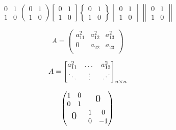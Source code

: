 \documentclass{ctexart}
\newcommand{\adots}{\mathinner{
\mkern2mu\raisebox{0.1em}{.}
\mkern2mu\raisebox{0.4em}{.}
\mkern2mu\raisebox{0.7em}{.}\mkern1mu}}
\begin{document}
    \[  
        \begin{matrix}
            0 & 1   \\
            1 & 0
        \end{matrix}
        \begin{pmatrix}
            0 & 1   \\
            1 & 0
        \end{pmatrix}
        \begin{bmatrix}
            0 & 1   \\
            1 & 0
        \end{bmatrix}
        \begin{Bmatrix}
            0 & 1   \\
            1 & 0
        \end{Bmatrix}
        \begin{vmatrix}
            0 & 1   \\
            1 & 0
        \end{vmatrix}
        \begin{Vmatrix}
            0 & 1   \\
            1 & 0
        \end{Vmatrix}
    \]

    \[
    A = \begin{pmatrix}
        a_{11}^2 & a_{12}^2 & a_{13}^2  \\
        0        & a_{22} & a_{23}  \\
    \end{pmatrix}
    \]

    \[
        A = \begin{bmatrix}
            a_{11}^2 & \dots& a_{13}^2  \\
            \ddots       & \vdots & \adots  \\
        \end{bmatrix}_{n \times n}
    \]

    \[
    \begin{pmatrix}
        \begin{matrix}
            1&0 \\ 0 & 1 
        \end{matrix} & \text{\Large 0} \\
        \text {\Large 0} & \begin{matrix}   %
            1&0 \\ 0 & -1   
        \end{matrix}
    \end{pmatrix}
    \]
\end{document}

